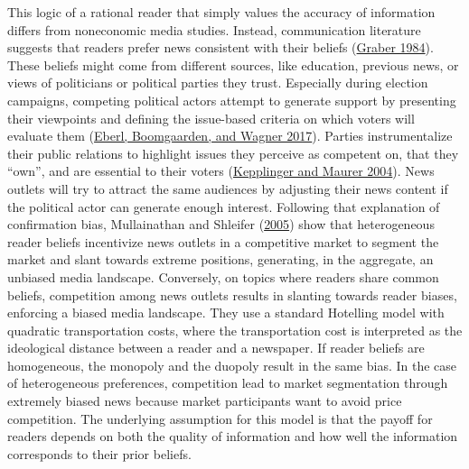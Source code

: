 \documentclass[
  12pt,
]{article}
\begin{document}
This logic of a rational reader that simply values the accuracy of
information differs from noneconomic media studies. Instead,
communication literature suggests that readers prefer news consistent
with their beliefs
(\protect\hyperlink{ref-graber_processing_1984}{Graber 1984}). These
beliefs might come from different sources, like education, previous
news, or views of politicians or political parties they trust.
Especially during election campaigns, competing political actors attempt
to generate support by presenting their viewpoints and defining the
issue-based criteria on which voters will evaluate them
(\protect\hyperlink{ref-eberl_one_2017}{Eberl, Boomgaarden, and Wagner
2017}). Parties instrumentalize their public relations to highlight
issues they perceive as competent on, that they ``own'', and are
essential to their voters
(\protect\hyperlink{ref-kepplinger_einfluss_2004}{Kepplinger and Maurer
2004}). News outlets will try to attract the same audiences by adjusting
their news content if the political actor can generate enough interest.
Following that explanation of confirmation bias, Mullainathan and
Shleifer (\protect\hyperlink{ref-mullainathan_market_2005}{2005}) show
that heterogeneous reader beliefs incentivize news outlets in a
competitive market to segment the market and slant towards extreme
positions, generating, in the aggregate, an unbiased media landscape.
Conversely, on topics where readers share common beliefs, competition
among news outlets results in slanting towards reader biases, enforcing
a biased media landscape. They use a standard Hotelling model with
quadratic transportation costs, where the transportation cost is
interpreted as the ideological distance between a reader and a
newspaper. If reader beliefs are homogeneous, the monopoly and the
duopoly result in the same bias. In the case of heterogeneous
preferences, competition lead to market segmentation through extremely
biased news because market participants want to avoid price competition.
The underlying assumption for this model is that the payoff for readers
depends on both the quality of information and how well the information
corresponds to their prior beliefs.
\end{document}
